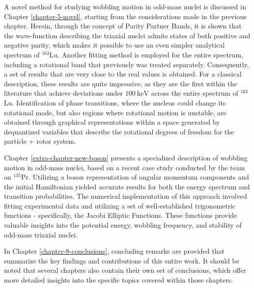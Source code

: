 A novel method for studying wobbling motion in odd-mass nuclei is discussed in Chapter \ref{chapter-5-novel}, starting from the considerations made in the previous chapter. Herein, through the concept of Parity Partner Bands, it is shown that the wave-function describing the triaxial nuclei admits states of both positive and negative parity, which makes it possible to use an even simpler analytical spectrum of $^{163}$Lu. Another fitting method is employed for the entire spectrum, including a rotational band that previously was treated separately. Consequently, a set of results that are very close to the real values is obtained. For a classical description, these results are quite impressive, as they are the first within the literature that achieve deviations under $100\ \text{keV}$ across the entire spectrum of $^{163}$Lu. Identification of phase transitions, where the nucleus could change its rotational mode, but also regions where rotational motion is unstable, are obtained through graphical representations within a space generated by dequantized variables that describe the rotational degrees of freedom for the particle + rotor system. 

Chapter \ref{extra-chapter-new-boson} presents a specialized description of wobbling motion in odd-mass nuclei, based on a recent case study conducted by the team on $^{135}$Pr. Utilizing a boson representation of angular momentum components and the initial Hamiltonian yielded accurate results for both the energy spectrum and transition probabilities. The numerical implementation of this approach involved fitting experimental data and utilizing a set of well-established trigonometric functions - specifically, the Jacobi Elliptic Functions. These functions provide valuable insights into the potential energy, wobbling frequency, and stability of odd-mass triaxial nuclei.

In Chapter \ref{chapter-8-conclusions}, concluding remarks are provided that summarize the key findings and contributions of this entire work. It should be noted that several chapters also contain their own set of conclusions, which offer more detailed insights into the specific topics covered within those chapters.